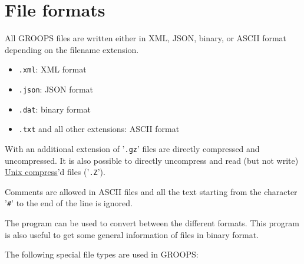 \section{File formats}\label{general.fileFormat}
All GROOPS files are written either in XML, JSON, binary, or ASCII format depending on the filename extension.
\begin{itemize}
\item \verb|.xml|: XML format
\item \verb|.json|: JSON format
\item \verb|.dat|: binary format
\item \verb|.txt| and all other extensions: ASCII format
\end{itemize}

With an additional extension of '\verb|.gz|' files are directly compressed and uncompressed. It is also possible to directly uncompress and read (but not write) \href{https://en.wikipedia.org/wiki/Compress}{Unix compress}'d files ('\verb|.Z|').

Comments are allowed in ASCII files and all the text starting from the character '\verb|#|' to the end of the line is ignored.

The program  can be used to convert between the different formats. This program is also useful to get
some general information of files in binary format.

The following special file types are used in GROOPS:
